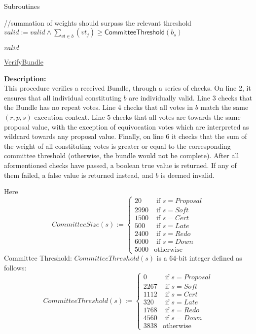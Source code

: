 \documentclass[10pt,a4paper]{article}
\begin{document}
\begin{section}{Subroutines}
\begin{algorithm}[H]
\begin{algorithmic}[1]
    //summation of weights should surpass the relevant threshold
    \State $valid := valid \land  \sum_{vt \in b}(vt_j) \geq \mathsf{CommitteeThreshold}(b_s)$

    \State \Return $valid$

    \EndFunction
    \end{algorithmic}
    \caption{\underline{VerifyBundle}}
\end{algorithm}

\noindent \textbf{Description:}\\
This procedure verifies a received Bundle, through a series 
of checks.
On line 2, it ensures that all individual constituting $b$
are individually valid.
Line 3 checks that the Bundle has no repeat votes.
Line 4 checks that all votes in $b$ match the same $(r,p,s)$
execution context.
Line 5 checks that all votes are towards the same proposal value,
with the exception of equivocation votes which are interpreted as wildcard
towards any proposal value.
Finally, on line 6 it checks that the sum of the weight of all constituting
votes is greater or equal to the corresponding committee threshold (otherwise, 
the bundle would not be complete).
After all aformentioned checks have passed, a boolean true value is returned.
If any of them failed, a false value is returned instead, and $b$ is deemed invalid.

Here
$$
CommitteeSize(s):= \left\{
\begin{array}{rl}
     20 & \text{ if }s = Proposal \\
   2990 & \text{ if }s = Soft \\
   1500 & \text{ if }s = Cert \\
    500 & \text{ if }s = Late \\
   2400 & \text{ if }s = Redo \\
   6000 & \text{ if }s = Down \\
   5000 & \text{otherwise}
\end{array}
\right.
$$
Committee Threshold: $CommitteeThreshold(s)$ is a 64-bit integer defined as follows:
$$
CommitteeThreshold(s):= \left\{
\begin{array}{rl}
     0 &  \text{ if }s = Proposal \\
  2267 &  \text{ if }s = Soft \\
  1112 &  \text{ if }s = Cert \\
   320 &  \text{ if }s = Late \\
  1768 &  \text{ if }s = Redo \\
  4560 &  \text{ if }s = Down \\
  3838 &  \text{otherwise}
\end{array}
\right.
$$


\end{section}
\end{document}
